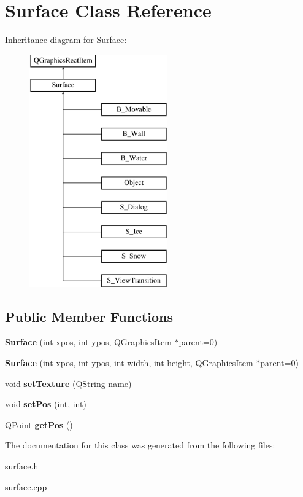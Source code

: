 \hypertarget{class_surface}{}\section{Surface Class Reference}
\label{class_surface}
Inheritance diagram for Surface\+:\begin{figure}[H]
\begin{center}
\leavevmode
\includegraphics[height=10.000000cm]{class_surface}
\end{center}
\end{figure}
\subsection*{Public Member Functions}
\begin{DoxyCompactItemize}
\item 
\hypertarget{class_surface_ac03bea7e4e17982fd17f8a571035a6f0}{}{\bfseries Surface} (int xpos, int ypos, Q\+Graphics\+Item $\ast$parent=0)\label{class_surface_ac03bea7e4e17982fd17f8a571035a6f0}

\item 
\hypertarget{class_surface_a3e1af81e4723f854196608b966a86415}{}{\bfseries Surface} (int xpos, int ypos, int width, int height, Q\+Graphics\+Item $\ast$parent=0)\label{class_surface_a3e1af81e4723f854196608b966a86415}

\item 
\hypertarget{class_surface_aa47fe5aa52e8b6fc89b9598a31b0eebb}{}void {\bfseries set\+Texture} (Q\+String name)\label{class_surface_aa47fe5aa52e8b6fc89b9598a31b0eebb}

\item 
\hypertarget{class_surface_a025ed38853ae95be3c6fe8814711ffc3}{}void {\bfseries set\+Pos} (int, int)\label{class_surface_a025ed38853ae95be3c6fe8814711ffc3}

\item 
\hypertarget{class_surface_acbdbf91a4cca74bb9da6c8a2fa932cd7}{}Q\+Point {\bfseries get\+Pos} ()\label{class_surface_acbdbf91a4cca74bb9da6c8a2fa932cd7}

\end{DoxyCompactItemize}


The documentation for this class was generated from the following files\+:\begin{DoxyCompactItemize}
\item 
surface.\+h\item 
surface.\+cpp\end{DoxyCompactItemize}
